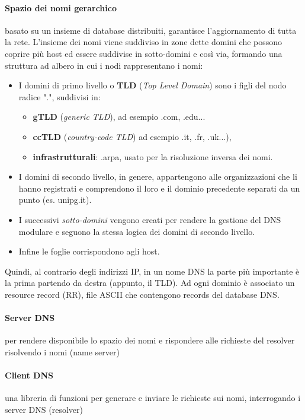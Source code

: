 \documentclass[a4paper,11pt]{article}
\def\vedi#1{\nameref{#1}}
\begin{document}
\paragraph{Spazio dei nomi gerarchico} basato su un insieme di database distribuiti, garantisce l'aggiornamento di tutta la rete. L'insieme dei nomi viene suddiviso in zone dette domini che possono coprire più host ed essere suddivise in sotto-domini e così via, formando una struttura ad albero in cui i nodi rappresentano i nomi:
\begin{itemize}
\item I domini di primo livello o \textbf{TLD} (\textit{Top Level Domain}) sono i figli del nodo radice ".", suddivisi in: 
\begin{itemize}
\item \textbf{gTLD} (\textit{generic TLD}), ad esempio .com, .edu...
\item \textbf{ccTLD} (\textit{country-code TLD}) ad esempio .it, .fr, .uk...),
\item \textbf{infrastrutturali}: .arpa, usato per la risoluzione inversa dei nomi. 
\end{itemize}
\item I domini di secondo livello, in genere, appartengono alle organizzazioni che li hanno registrati e comprendono il loro e il dominio precedente separati da un punto (es. unipg.it).
\item I successivi \textit{sotto-domini} vengono creati per rendere la gestione del DNS modulare e seguono la stessa logica dei domini di secondo livello.
\item Infine le foglie corrispondono agli host. 
\end{itemize}
Quindi, al contrario degli indirizzi IP, in un nome DNS la parte più importante è la prima partendo da destra (appunto, il TLD).
Ad ogni dominio è associato un resource record (RR), file ASCII che contengono records del database DNS.  %
\paragraph{Server DNS} per rendere disponibile lo spazio dei nomi e rispondere alle richieste del resolver risolvendo i nomi (name server)
\paragraph{Client DNS} una libreria di funzioni per generare e inviare le richieste sui nomi, interrogando i server DNS (resolver)
\end{document}
